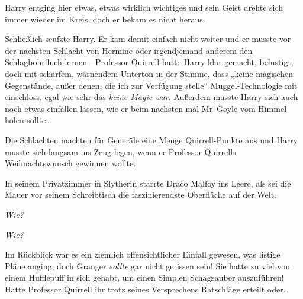 Harry entging hier etwas, etwas wirklich wichtiges und sein Geist drehte sich immer wieder im Kreis, doch er bekam es nicht heraus.

Schließlich seufzte Harry. Er kam damit einfach nicht weiter und er musste vor der nächsten Schlacht von Hermine oder irgendjemand anderem den Schlagbohrfluch lernen—Professor Quirrell hatte Harry klar gemacht, belustigt, doch mit scharfem, warnendem Unterton in der Stimme, dass „keine magischen Gegenstände, außer denen, die ich zur Verfügung stelle“ Muggel-Technologie mit einschloss, egal wie sehr das \emph{keine Magie war.} Außerdem musste Harry sich auch noch etwas einfallen lassen, wie er beim nächsten mal Mr~Goyle vom Himmel holen sollte…%

Die Schlachten machten für Generäle eine Menge Quirrell-Punkte aus und Harry musste sich langsam ins Zeug legen, wenn er Professor Quirrells Weihnachtswunsch gewinnen wollte.

\later

In seinem Privatzimmer in Slytherin starrte Draco Malfoy ins Leere, als sei die Mauer vor seinem Schreibtisch die faszinierendste Oberfläche auf der Welt.

\emph{Wie?}

\emph{Wie?}

Im Rückblick war es ein ziemlich offensichtlicher Einfall gewesen, was listige Pläne anging, doch Granger \emph{sollte} gar nicht gerissen sein! Sie hatte zu viel von einem Hufflepuff in sich gehabt, um einen Simplen Schagzauber auszuführen! Hatte Professor Quirrell ihr trotz seines Versprechens Ratschläge erteilt oder…

